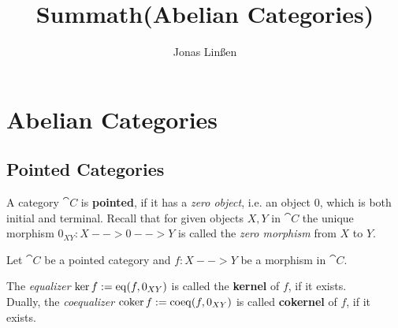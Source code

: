 

\title{Summath(Abelian Categories)}
\author{Jonas Linßen}


	\maketitle
	\tableofcontents

	\newpage
	\section{Abelian Categories}
	\subsection{Pointed Categories}

	\begin{definition}
		A category $\cat{C}$ is \textbf{pointed}, if it has a \textit{zero object}, i.e. an object $0$, which is both initial and terminal. Recall that for given objects $X,Y$ in $\cat{C}$ the unique morphism $0_{XY}:X-->0-->Y$ is called the \textit{zero morphism} from $X$ to $Y$.
	\end{definition}

	\begin{definition}
		Let $\cat{C}$ be a pointed category and $f:X-->Y$ be a morphism in $\cat{C}$.

		The \textit{equalizer} $\ker f := \operatorname{eq} (f,0_{XY})$ is called the \textbf{kernel} of $f$, if it exists.\\
		Dually, the \textit{coequalizer} $\operatorname{coker} f := \operatorname{coeq}(f,0_{XY})$ is called \textbf{cokernel} of $f$, if it exists.
	\end{definition}

